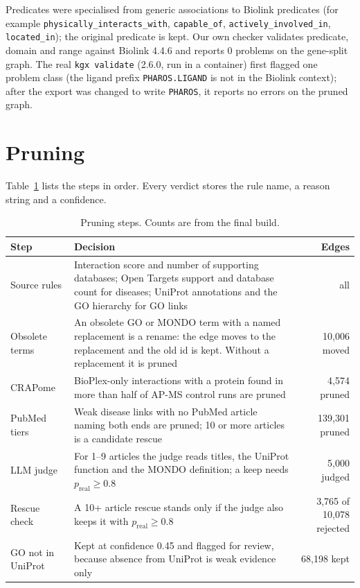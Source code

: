 \documentclass[11pt]{article}
\begin{document}
Predicates were specialised from generic associations to Biolink predicates (for example \texttt{physically\_interacts\_with}, \texttt{capable\_of}, \texttt{actively\_involved\_in}, \texttt{located\_in}); the original predicate is kept. Our own checker validates predicate, domain and range against Biolink 4.4.6 and reports 0 problems on the gene-split graph. The real \texttt{kgx validate} (2.6.0, run in a container) first flagged one problem class (the ligand prefix \texttt{PHAROS.LIGAND} is not in the Biolink context); after the export was changed to write \texttt{PHAROS}, it reports no errors on the pruned graph.

\section{Pruning}
Table~\ref{tab:rules} lists the steps in order. Every verdict stores the rule name, a reason string and a confidence.
\begin{table}[h]\centering\small
\begin{tabular}{@{}p{3.2cm}p{8.3cm}r@{}}\toprule
Step & Decision & Edges\\\midrule
Source rules & Interaction score and number of supporting databases; Open Targets support and database count for diseases; UniProt annotations and the GO hierarchy for GO links & all\\
Obsolete terms & An obsolete GO or MONDO term with a named replacement is a rename: the edge moves to the replacement and the old id is kept. Without a replacement it is pruned & 10,006 moved\\
CRAPome & BioPlex-only interactions with a protein found in more than half of AP-MS control runs are pruned & 4,574 pruned\\
PubMed tiers & Weak disease links with no PubMed article naming both ends are pruned; 10 or more articles is a candidate rescue & 139,301 pruned\\
LLM judge & For 1--9 articles the judge reads titles, the UniProt function and the MONDO definition; a keep needs $p_{\mathrm{real}}\ge 0.8$ & 5,000 judged\\
Rescue check & A 10+ article rescue stands only if the judge also keeps it with $p_{\mathrm{real}}\ge 0.8$ & 3,765 of 10,078 rejected\\
GO not in UniProt & Kept at confidence 0.45 and flagged for review, because absence from UniProt is weak evidence only & 68,198 kept\\\bottomrule
\end{tabular}
\caption{Pruning steps. Counts are from the final build.}\label{tab:rules}
\end{table}
\end{document}
